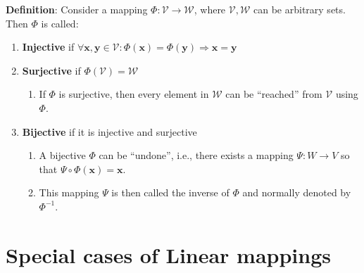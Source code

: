 \textbf{Definition}: Consider a mapping $\Phi : \mathcal{V} \to \mathcal{W}$, where $\mathcal{V}, \mathcal{W}$ can be arbitrary sets. 
Then $\Phi$ is called:
\hfill \cite{mfml/book/mml/Deisenroth-Faisal-Ong}

\begin{enumerate}
    \item \textbf{Injective} if $\forall \bm{x}, \bm{y} \in \mathcal{V} : \Phi(\bm{x}) = \Phi(\bm{y}) \Rightarrow \bm{x} = \bm{y}$
    \hfill \cite{mfml/book/mml/Deisenroth-Faisal-Ong}

    \item \textbf{Surjective} if $\Phi(\mathcal{V}) = \mathcal{W}$
    \hfill \cite{mfml/book/mml/Deisenroth-Faisal-Ong}
    \begin{enumerate}
        \item If $\Phi$ is surjective, then every element in $\mathcal{W}$ can be “reached” from $\mathcal{V}$ using $\Phi$.
        \hfill \cite{mfml/book/mml/Deisenroth-Faisal-Ong}
    \end{enumerate}
    
    \item \textbf{Bijective} if it is injective and surjective
    \hfill \cite{mfml/book/mml/Deisenroth-Faisal-Ong}
    \begin{enumerate}
        \item A bijective $\Phi$ can be “undone”, i.e., there exists a mapping $\Psi : W \to V$ so that $\Psi \circ \Phi(\bm{x}) = \bm{x}$.
        \hfill \cite{mfml/book/mml/Deisenroth-Faisal-Ong}

        \item This mapping $\Psi$ is then called the inverse of $\Phi$ and normally denoted by $\Phi^{-1}$.
        \hfill \cite{mfml/book/mml/Deisenroth-Faisal-Ong}
    \end{enumerate}    

\end{enumerate}


















\section{Special cases of Linear mappings}

